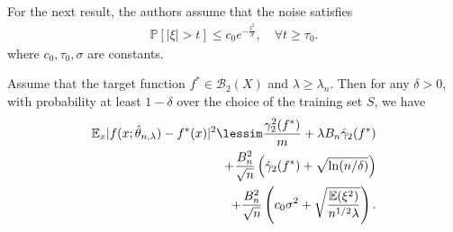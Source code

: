 \documentclass{article}
\newenvironment{manualtheorem}[1]{%
  \renewcommand\themanualtheoreminner{#1}%
  \manualtheoreminner
}{\endmanualtheoreminner}
\begin{document}
For the next result, the authors assume that the noise satisfies 
\begin{align*}
    \mathbb{P}[|\xi| > t] \leq c_0 e^{-\frac{t^2}{\sigma}}, \quad \forall t \geq \tau_0.
\end{align*}
where $c_0, \tau_0, \sigma$ are constants.
\begin{manualtheorem}{4.2}
Assume that the target function $f^* \in \mathcal{B}_2(X)$ and $\lambda \geq \lambda_n$. Then for any $\delta > 0$, with probability at least $1- \delta$ over the choice of the training set $S$, we have
\begin{align*}
    \mathbb{E}_x|f(x; \hat{\theta}_{n, \lambda}) - f^*(x)|^2 \lessim \frac{\gamma_2^2(f^*)}{m} + \lambda B_n \hat{\gamma}_2(f^*)\\
    + \frac{B_n^2}{\sqrt{n}}\left( \hat{\gamma}_2(f^*) + \sqrt{\ln(n/\delta)} \right)\\
    + \frac{B_n^2}{\sqrt{n}}\left( c_0 \sigma^2 + \sqrt{\frac{\mathbb{E}(\xi^2)}{n^{1/2}\lambda}} \right).
\end{align*}
\end{manualtheorem}



\end{document}
